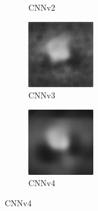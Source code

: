 \begin{figure}[H]
\begin{subfigure}[t]{0.15\textwidth}
    \caption{CNNv2}
  \end{subfigure}
  \begin{subfigure}[t]{0.15\textwidth}
    \includegraphics[width=\linewidth]{img/one-trial/prediction_4_cnnv3.png}
    \caption{CNNv3}
  \end{subfigure}
  \begin{subfigure}[t]{0.15\textwidth}
    \includegraphics[width=\linewidth]{img/one-trial/prediction_4_cnnv4.png}
    \caption{CNNv4}
  \end{subfigure}
  

\end{figure}
